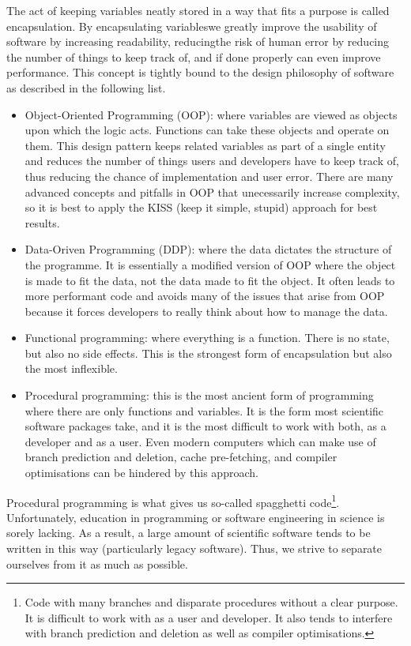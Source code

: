 The act of keeping variables neatly stored in a way that fits a purpose is called encapsulation. By encapsulating variableswe greatly improve the usability of software by increasing readability, reducingthe risk of human error by reducing the number of things to keep track of, and if done properly can even improve performance. This concept is tightly bound to the design philosophy of software as described in the following list.
\begin{itemize}
    \item Object-Oriented Programming (OOP): where variables are viewed as objects upon which the logic acts. Functions can take these objects and operate on them. This design pattern keeps related variables as part of a single entity and reduces the number of things users and developers have to keep track of, thus reducing the chance of implementation and user error. There are many advanced concepts and pitfalls in OOP that unecessarily increase complexity, so it is best to apply the KISS (keep it simple, stupid) approach for best results.
    \item Data-Oriven Programming (DDP): where the data dictates the structure of the programme. It is essentially a modified version of OOP where the object is made to fit the data, not the data made to fit the object. It often leads to more performant code and avoids many of the issues that arise from OOP because it forces developers to really think about how to manage the data.
    \item Functional programming: where everything is a function. There is no state, but also no side effects. This is the strongest form of encapsulation but also the most inflexible.
    \item Procedural programming: this is the most ancient form of programming where there are only functions and variables. It is the form most scientific software packages take, and it is the most difficult to work with both, as a developer and as a user. Even modern computers which can make use of branch prediction and deletion, cache pre-fetching, and compiler optimisations can be hindered by this approach.
\end{itemize}

Procedural programming is what gives us so-called spagghetti code\footnote{Code with many branches and disparate procedures without a clear purpose. It is difficult to work with as a user and developer. It also tends to interfere with branch prediction and deletion as well as compiler optimisations.}. Unfortunately, education in programming or software engineering in science is sorely lacking. As a result, a large amount of scientific software tends to be written in this way (particularly legacy software). Thus, we strive to separate ourselves from it as much as possible.

